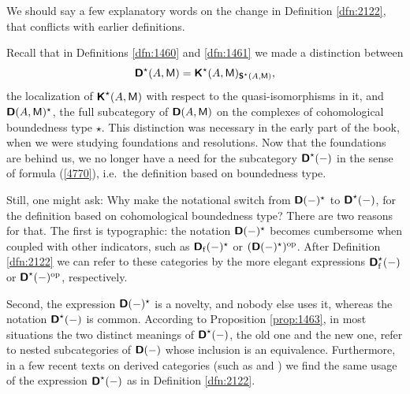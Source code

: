 \begin{rem} \label{rem:4765}
We should say a few explanatory words on the change in Definition 
\ref{dfn:2122}, that conflicts with earlier definitions. 

Recall that in Definitions \ref{dfn:1460} and \ref{dfn:1461} we made a 
distinction between 
\begin{equation} \label{4770}
\boldsymbol{\mathsf{D}}^{\star}(A, \operatorname{\mathsf{M}}) = 
\boldsymbol{\mathsf{K}}^{\star}(A, \operatorname{\mathsf{M}})_{\boldsymbol{\mathsf{S}}^{\star}(A, \operatorname{\mathsf{M}})} ,
\end{equation}
the localization of $\boldsymbol{\mathsf{K}}^{\star}(A, \operatorname{\mathsf{M}})$ with respect to the 
quasi-isomorphisms in it, and $\boldsymbol{\mathsf{D}}(A, \operatorname{\mathsf{M}})^{\star}$, 
the full subcategory of $\boldsymbol{\mathsf{D}}(A, \operatorname{\mathsf{M}})$ on the complexes of 
cohomological boundedness type $\star$. This distinction was necessary in the 
early part of the book, when we were studying foundations and resolutions.
Now that the foundations are behind us, we no longer have a need for the 
subcategory $\boldsymbol{\mathsf{D}}^{\star}(-)$ in the sense of formula (\ref{4770}), i.e.\ 
the definition based on boundedness type. 

Still, one might ask: Why make the notational switch from 
$\boldsymbol{\mathsf{D}}(-)^{\star}$ to $\boldsymbol{\mathsf{D}}^{\star}(-)$, for the definition based on 
cohomological boundedness type? 
There are two reasons for that. The first is typographic: 
the notation $\boldsymbol{\mathsf{D}}(-)^{\star}$ becomes cumbersome when 
coupled with other indicators, such as
$\boldsymbol{\mathsf{D}}_{\mathrm{f}}(-)^{\star}$
or $(\boldsymbol{\mathsf{D}}(-)^{\star})^{\mathrm{op}}$.
After Definition \ref{dfn:2122} we can refer to these categories by the more 
elegant expressions $\boldsymbol{\mathsf{D}}^{\star}_{\mathrm{f}}(-)$
or $\boldsymbol{\mathsf{D}}^{\star}(-)^{\mathrm{op}}$, respectively. 

Second, the expression $\boldsymbol{\mathsf{D}}(-)^{\star}$ is a novelty, and nobody else uses 
it, whereas the notation $\boldsymbol{\mathsf{D}}^{\star}(-)$ is common. According 
to Proposition \ref{prop:1463}, in most situations the two distinct meanings of
$\boldsymbol{\mathsf{D}}^{\star}(-)$, the old one and the new one, refer to nested 
subcategories of $\boldsymbol{\mathsf{D}}(-)$ whose inclusion is an equivalence. Furthermore, 
in a few recent texts on derived categories (such as 
\cite[Definition tag=05RU]{SP} and \cite[Definition 1.11]{Ye8}) we find the 
same usage of the expression $\boldsymbol{\mathsf{D}}^{\star}(-)$ as in Definition 
\ref{dfn:2122}.
\end{rem}



\label{subsec:RHom}

